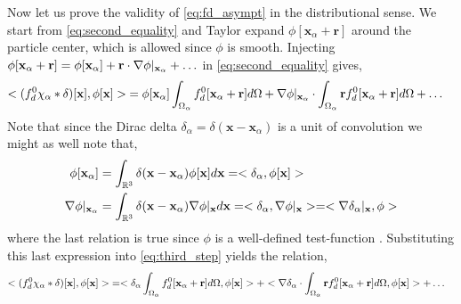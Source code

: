 Now let us prove the validity of \ref{eq:fd_asympt} in the distributional sense. 
We start from \ref{eq:second_equality} and Taylor expand $\phi[\textbf{x}_\alpha +\textbf{r}]$ around the particle center, which is allowed since $\phi$ is smooth. 
Injecting $\phi[\textbf{x}_\alpha +\textbf{r}] = \phi[\textbf{x}_\alpha] + \textbf{r} \cdot \mathbf{\nabla} \phi|_{\textbf{x}_\alpha} + \ldots$ in \ref{eq:second_equality} gives, 
\begin{align}
    <   (f^0_d \chi_\alpha *\delta)[\textbf{x}]
    , \phi[\textbf{x}]> 
    &= 
    \phi[\textbf{x}_\alpha]
    \intO{
    f^0_d[\textbf{x}_\alpha + \textbf{r}]
     }
    + 
    \grad\phi|_{\textbf{x}_\alpha}
    \cdot 
    \intO{
    \textbf{r}
    f^0_d[\textbf{x}_\alpha + \textbf{r}]
     }
    + \ldots
    \label{eq:third_step}
\end{align}
Note that since the Dirac delta $\delta_\alpha = \delta(\textbf{x}- \textbf{x}_\alpha)$ is a unit of convolution we might as well note that, 
\begin{align*}
    \phi[\textbf{x}_\alpha]
    &= \int_{\mathbb{R}^3} 
    \delta(\textbf{x} - \textbf{x}_\alpha)
    \phi[\textbf{x}]
    d\textbf{x}
    =  <\delta_\alpha, \phi[\textbf{x}]>
    \\
    \mathbf{\nabla}\phi|_{\textbf{x}_\alpha}
    &= 
    \int_{\mathbb{R}^3} 
    \delta(\textbf{x} - \textbf{x}_\alpha)
    \mathbf{\nabla}\phi|_{\textbf{x}}
    d\textbf{x}
    = <
    \delta_\alpha,
    \mathbf{\nabla}\phi|_{\textbf{x}}
    >
    = <
    \mathbf{\nabla}\delta_\alpha|_{\textbf{x}},
    \phi
    >
\end{align*}
where the last relation is true since $\phi$ is a well-defined test-function \citet{appel2007}.
Substituting this last expression into \ref{eq:third_step} yields the relation, 
\begin{align}
    <   (f^0_d \chi_\alpha *\delta)[\textbf{x}]
    , \phi[\textbf{x}]> 
    &= 
    <\delta_\alpha
    \intO{
        f^0_d[\textbf{x}_\alpha + \textbf{r}]
    }
    , \phi[\textbf{x}]>
    + < \grad\delta_\alpha
    \cdot 
    \intO{
    \textbf{r}
    f^0_d[\textbf{x}_\alpha + \textbf{r}]
     }
     , \phi[\textbf{x}]>
    + \ldots
    \label{eq:last_step}
\end{align}

